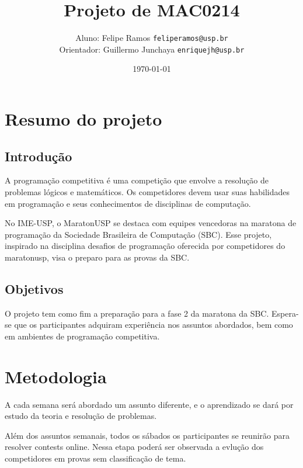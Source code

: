 \documentclass{article}
\title{Projeto de MAC0214}
\author[1]{
    Aluno: Felipe Ramos
    \texttt{feliperamos@usp.br} \\
    Orientador: Guillermo Junchaya 
    \texttt{enriquejh@usp.br}
}
\date{\today}
\begin{document}
\maketitle

\vspace{6cm}

\tableofcontents  %

\pagebreak

\section{Resumo do projeto}
\subsection{Introdução}
\hspace{1cm}A programação competitiva é uma competição que envolve a resolução de problemas lógicos e matemáticos. Os competidores devem usar suas habilidades em programação e seus conhecimentos de disciplinas de computação.

\hspace{5mm}No IME-USP, o MaratonUSP se destaca com equipes vencedoras na maratona de programação da Sociedade Brasileira de Computação (SBC). Esse projeto, inspirado na disciplina desafios de programação oferecida por competidores do maratonusp, visa o preparo para as provas da SBC.
\subsection{Objetivos}
\hspace{1cm} O projeto tem como fim a preparação para a fase 2 da maratona da SBC. Espera-se que os participantes adquiram experiência nos assuntos abordados, bem como em ambientes de programação competitiva.

\section{Metodologia}
\hspace{1cm}A cada semana será abordado um assunto diferente, e o aprendizado se dará por estudo da teoria e resolução de problemas.

\hspace{0.5cm}Além dos assuntos semanais, todos os sábados os participantes se reunirão para resolver contests online. Nessa etapa poderá ser observada a evlução dos competidores em provas sem classificação de tema.
\end{document}
